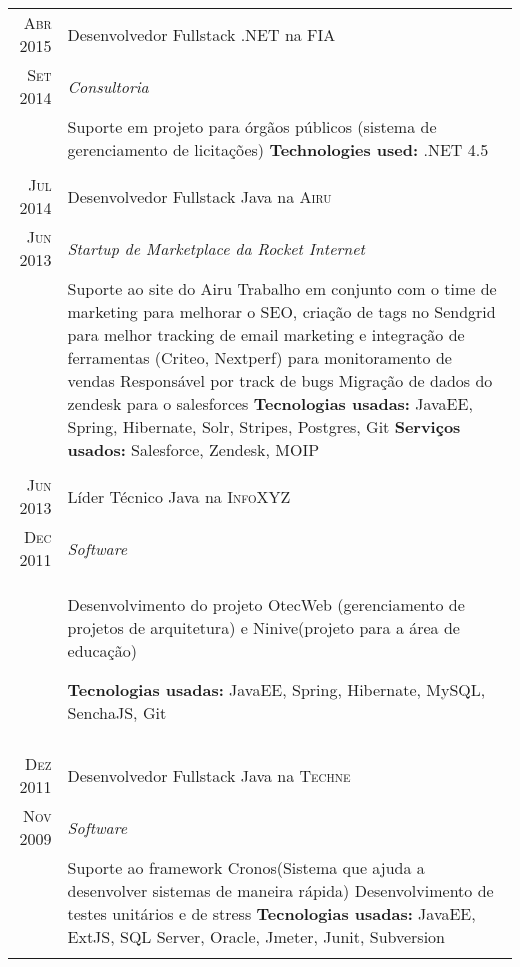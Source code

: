 \documentclass[a4paper,10pt]{article}
\begin{document}
\begin{tabular}{r|p{11cm}}


\textsc{Abr 2015}  & Desenvolvedor Fullstack .NET na \textsc{FIA} \\
\textsc{Set 2014}&\emph{Consultoria}\\&\footnotesize{Suporte em projeto para órgãos públicos (sistema de gerenciamento de licitações)\newline
\textbf{Technologies used:} .NET 4.5 
 }\\\multicolumn{2}{c}{} \\



 \textsc{Jul 2014} & Desenvolvedor Fullstack Java na \textsc{Airu} \\\textsc{Jun 2013}&\emph{Startup de Marketplace da Rocket Internet }\\&\footnotesize{ Suporte ao site do Airu\newline
    Trabalho em conjunto com o time de marketing para melhorar o SEO, criação de tags no Sendgrid para melhor tracking de email marketing e integração de ferramentas (Criteo, Nextperf) para monitoramento de vendas\newline
    Responsável por track de bugs\newline
    Migração de dados do zendesk para o salesforces\newline
\textbf{Tecnologias usadas:} JavaEE, Spring, Hibernate, Solr, Stripes, Postgres, Git\newline
\textbf{Serviços usados:} Salesforce, Zendesk, MOIP 
 }\\\multicolumn{2}{c}{} \\


\textsc{Jun 2013} & Líder Técnico Java na \textsc{InfoXYZ} \\\textsc{Dec 2011}&\emph{Software}\\&\footnotesize{  Desenvolvimento do projeto OtecWeb (gerenciamento de projetos de arquitetura) e Ninive(projeto para a área de educação)\newline

\textbf{Tecnologias usadas:} JavaEE, Spring, Hibernate, MySQL, SenchaJS, Git
 }\\\multicolumn{2}{c}{} \\

\textsc{Dez 2011} & Desenvolvedor Fullstack Java na \textsc{Techne} \\\textsc{Nov 2009}&\emph{Software}\\&\footnotesize{ Suporte ao framework Cronos(Sistema que ajuda a desenvolver sistemas de maneira rápida)\newline
                          Desenvolvimento de testes unitários e de stress \newline
\textbf{Tecnologias usadas:} JavaEE, ExtJS, SQL Server, Oracle, Jmeter, Junit, Subversion
 }\\\multicolumn{2}{c}{} \\


\end{tabular}
\end{document}
